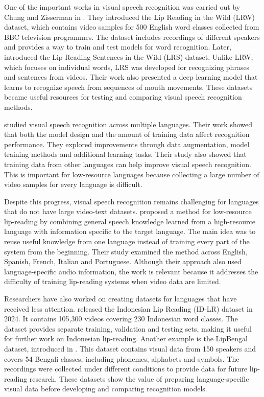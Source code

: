 \documentclass[journal]{IEEEtran}
\begin{document}
One of the important works in visual speech recognition was carried out by Chung and Zisserman in \cite{chung2016lipreading}. They introduced the Lip Reading in the Wild (LRW) dataset, which contains video samples for 500 English word classes collected from BBC television programmes. The dataset includes recordings of different speakers and provides a way to train and test models for word recognition. Later, \cite{chung2017sentences} introduced the Lip Reading Sentences in the Wild (LRS) dataset. Unlike LRW, which focuses on individual words, LRS was developed for recognizing phrases and sentences from videos. Their work also presented a deep learning model that learns to recognize speech from sequences of mouth movements. These datasets became useful resources for testing and comparing visual speech recognition methods.

\cite{ma2022multilingualvsr} studied visual speech recognition across multiple languages. Their work showed that both the model design and the amount of training data affect recognition performance. They explored improvements through data augmentation, model training methods and additional learning tasks. Their study also showed that training data from other languages can help improve visual speech recognition. This is important for low-resource languages because collecting a large number of video samples for every language is difficult.

Despite this progress, visual speech recognition remains challenging for languages that do not have large video-text datasets. \cite{kim2023lowresource} proposed a method for low-resource lip-reading by combining general speech knowledge learned from a high-resource language with information specific to the target language. The main idea was to reuse useful knowledge from one language instead of training every part of the system from the beginning. Their study examined the method across English, Spanish, French, Italian and Portuguese. Although their approach also used language-specific audio information, the work is relevant because it addresses the difficulty of training lip-reading systems when video data are limited.

Researchers have also worked on creating datasets for languages that have received less attention. \cite{rahmatullah2024idlr} released the Indonesian Lip Reading (ID-LR) dataset in 2024. It contains 105,300 videos covering 230 Indonesian word classes. The dataset provides separate training, validation and testing sets, making it useful for further work on Indonesian lip-reading. Another example is the LipBengal dataset, introduced in \cite{lipbengal2025}. This dataset contains visual data from 150 speakers and covers 54 Bengali classes, including phonemes, alphabets and symbols. The recordings were collected under different conditions to provide data for future lip-reading research. These datasets show the value of preparing language-specific visual data before developing and comparing recognition models.
\end{document}
